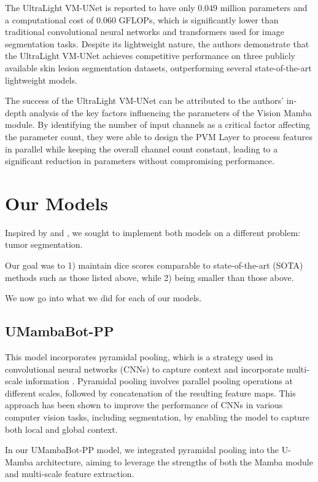 \documentclass[conference]{IEEEtran}
\begin{document}
The UltraLight VM-UNet is reported to have only 0.049 million parameters and a computational cost of 0.060 GFLOPs, which is significantly lower than traditional convolutional neural networks and transformers used for image segmentation tasks. Despite its lightweight nature, the authors demonstrate that the UltraLight VM-UNet achieves competitive performance on three publicly available skin lesion segmentation datasets, outperforming several state-of-the-art lightweight models.

The success of the UltraLight VM-UNet can be attributed to the authors' in-depth analysis of the key factors influencing the parameters of the Vision Mamba module. By identifying the number of input channels as a critical factor affecting the parameter count, they were able to design the PVM Layer to process features in parallel while keeping the overall channel count constant, leading to a significant reduction in parameters without compromising performance.

\section{Our Models}

Inspired by \cite{ma2024umamba} and \cite{wu2024ultralight}, we sought to implement both models on a different problem: tumor segmentation.

Our goal was to 1) maintain dice scores comparable to state-of-the-art (SOTA) methods such as those listed above, while 2) being smaller than those above.

We now go into what we did for each of our models.


\subsection{UMambaBot-PP}

This model incorporates pyramidal pooling, which is a strategy used in convolutional neural networks (CNNs) to capture context and incorporate multi-scale information \cite{zhao2017pyramid}. Pyramidal pooling involves parallel pooling operations at different scales, followed by concatenation of the resulting feature maps. This approach has been shown to improve the performance of CNNs in various computer vision tasks, including segmentation, by enabling the model to capture both local and global context.

In our UMambaBot-PP model, we integrated pyramidal pooling into the U-Mamba architecture, aiming to leverage the strengths of both the Mamba module and multi-scale feature extraction.
\end{document}

